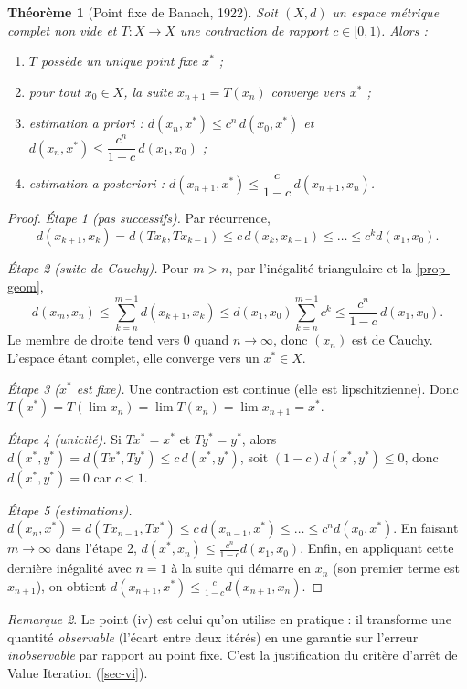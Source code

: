 \documentclass[11pt,a4paper]{article}
\theoremstyle{plain}
\newtheorem{theoreme}{Théorème}[section]
\theoremstyle{definition}
\theoremstyle{remark}
\newtheorem{remarque}[theoreme]{Remarque}
\newcommand{\1}{\mathbf{1}}
\begin{document}
\begin{theoreme}[Point fixe de Banach, 1922]\label{thm-banach}
Soit $(X,d)$ un espace métrique complet non vide et $T:X\to X$ une contraction de rapport $c\in[0,1)$. Alors :
\begin{enumerate}[label=(\roman*)]
\item $T$ possède un unique point fixe $x^*$ ;
\item pour tout $x_0\in X$, la suite $x_{n+1}=T(x_n)$ converge vers $x^*$ ;
\item estimation a priori : $d(x_n,x^*)\le c^n\,d(x_0,x^*)$ et $d(x_n,x^*)\le\dfrac{c^n}{1-c}\,d(x_1,x_0)$ ;
\item estimation a posteriori : $d(x_{n+1},x^*)\le\dfrac{c}{1-c}\,d(x_{n+1},x_n)$.
\end{enumerate}
\end{theoreme}
\begin{proof}
\emph{Étape 1 (pas successifs).} Par récurrence,
\[
d(x_{k+1},x_k)=d(Tx_k,Tx_{k-1})\le c\,d(x_k,x_{k-1})\le\dots\le c^k d(x_1,x_0).
\]

\emph{Étape 2 (suite de Cauchy).} Pour $m>n$, par l'inégalité triangulaire et la \cref{prop-geom},
\[
d(x_m,x_n)\le\sum_{k=n}^{m-1}d(x_{k+1},x_k)\le d(x_1,x_0)\sum_{k=n}^{m-1}c^k\le\frac{c^n}{1-c}\,d(x_1,x_0).
\]
Le membre de droite tend vers $0$ quand $n\to\infty$, donc $(x_n)$ est de Cauchy. L'espace étant complet, elle converge vers un $x^*\in X$.

\emph{Étape 3 ($x^*$ est fixe).} Une contraction est continue (elle est lipschitzienne). Donc $T(x^*)=T(\lim x_n)=\lim T(x_n)=\lim x_{n+1}=x^*$.

\emph{Étape 4 (unicité).} Si $Tx^*=x^*$ et $Ty^*=y^*$, alors $d(x^*,y^*)=d(Tx^*,Ty^*)\le c\,d(x^*,y^*)$, soit $(1-c)d(x^*,y^*)\le0$, donc $d(x^*,y^*)=0$ car $c<1$.

\emph{Étape 5 (estimations).} $d(x_n,x^*)=d(Tx_{n-1},Tx^*)\le c\,d(x_{n-1},x^*)\le\dots\le c^n d(x_0,x^*)$. En faisant $m\to\infty$ dans l'étape 2, $d(x^*,x_n)\le\frac{c^n}{1-c}d(x_1,x_0)$. Enfin, en appliquant cette dernière inégalité avec $n=1$ à la suite qui démarre en $x_n$ (son premier terme est $x_{n+1}$), on obtient $d(x_{n+1},x^*)\le\frac{c}{1-c}d(x_{n+1},x_n)$.
\end{proof}

\begin{remarque}
Le point (iv) est celui qu'on utilise en pratique : il transforme une quantité \emph{observable} (l'écart entre deux itérés) en une garantie sur l'erreur \emph{inobservable} par rapport au point fixe. C'est la justification du critère d'arrêt de Value Iteration (\cref{sec-vi}).
\end{remarque}
\end{document}
